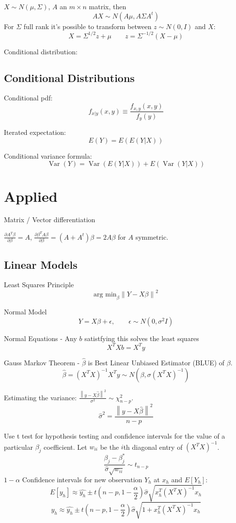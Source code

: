 \documentclass[10pt, twocolumn]{article}
\newcommand{\norm}[1]{\left\lVert#1\right\rVert}
\newcommand{\Var}{\operatorname{Var}}
\begin{document}
$X \sim N(\mu, \Sigma)$, $A$ an $m \times n$ matrix,
then 
\[
    AX \sim N(A \mu, A \Sigma A^t)
\]
For $\Sigma$ full rank it's possible to transform between $z \sim
N(0, I)$ and $X$:
\[
    X = \Sigma^{1/2} z + \mu \qquad z = \Sigma^{-1/2} (X - \mu)
\]

Conditional distribution:


\subsection{Conditional Distributions}

Conditional pdf:
\[
    f_{x|y}(x, y) \equiv \frac{f_{x, y}(x, y)}{f_y(y)}
\]

Iterated expectation:
\[
    E(Y) = E(E(Y | X))
\]

Conditional variance formula:
\[
    \Var(Y) = \Var(E(Y | X)) + E(\Var(Y | X))
\]

\newpage
\section{Applied}

Matrix / Vector differentiation

$\frac{\partial A^T \beta}{\partial \beta} = A$, 
$\frac{\partial \beta^T A \beta}{\partial \beta} = (A + A^t) \beta =
2A\beta$ for $A$ symmetric.

\subsection{Linear Models}

Least Squares Principle
\[
    \text{arg min}_\beta \norm{Y - X\beta}^2
\]

Normal Model 
\[
    Y = X\beta + \epsilon, \qquad \epsilon \sim N(0, \sigma^2 I)
\]

Normal Equations - Any $b$ satistfying this solves the least squares
\[
    X^T X b = X^T y
\]

Gauss Markov Theorem - $\hat{\beta}$ is Best Linear Unbiased
Estimator (BLUE) of $\beta$.
\[
    \hat{\beta} = (X^T X)^{-1} X^T y \sim N(\beta, \sigma (X^T X)^{-1})
\]

Estimating the variance: $\frac{\norm{y - X \hat{\beta}}^2}{\sigma^2} \sim
\chi^2_{n-p}$.
\[
    \hat{\sigma}^2 = \frac{\norm{y - X \hat{\beta}}^2}{n - p}
\]

Use t test for hypothesis testing and confidence intervals for the value of
a particular $\beta_j$ coefficient. 
Let $w_{ii}$ be the $i$th diagonal entry of $(X^T X)^{-1}$.
\[
    \frac{\beta_j - \beta_j^*}{\hat{\sigma} \sqrt{w_{ii}}} \sim t_{n-p}
\]
$1 - \alpha$ Confidence intervals for new observation $Y_h$ at $x_h$ and $E[Y_h]$:
\[
    E[y_h] \approx \hat{y_h} \pm t(n-p, 1 - \frac{\alpha}{2}) \hat{\sigma}
        \sqrt{x_h^T (X^T X)^{-1} x_h}
\]
\[
    y_h \approx \hat{y_h} \pm t(n-p, 1 - \frac{\alpha}{2}) \hat{\sigma}
        \sqrt{1 + x_h^T (X^T X)^{-1} x_h}
\]
\end{document}

